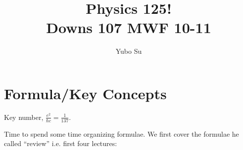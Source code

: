 \documentclass[10pt]{report}
\begin{document}

\title{Physics 125!\\ Downs 107 MWF 10-11}
\author{Yubo Su}
\date{ }

\maketitle

\tableofcontents

\chapter{Formula/Key Concepts}

Key number, $\frac{e^2}{\hbar c} = \frac{1}{137}$.

Time to spend some time organizing formulae. We first cover the formulae he called ``review'' i.e. first four lectures:
\end{document}
